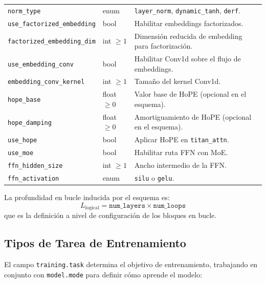 \documentclass[11pt,a4paper]{article}
\begin{document}
\begin{longtable}{p{5.1cm}p{2.4cm}p{7.0cm}}
\texttt{norm\_type} & enum & \texttt{layer\_norm}, \texttt{dynamic\_tanh}, \texttt{derf}. \\
\texttt{use\_factorized\_embedding} & bool & Habilitar embeddings factorizados. \\
\texttt{factorized\_embedding\_dim} & int $\ge 1$ & Dimensión reducida de embedding para factorización. \\
\texttt{use\_embedding\_conv} & bool & Habilitar Conv1d sobre el flujo de embeddings. \\
\texttt{embedding\_conv\_kernel} & int $\ge 1$ & Tamaño del kernel Conv1d. \\
\texttt{hope\_base} & float $\ge 0$ & Valor base de HoPE (opcional en el esquema). \\
\texttt{hope\_damping} & float $\ge 0$ & Amortiguamiento de HoPE (opcional en el esquema). \\
\texttt{use\_hope} & bool & Aplicar HoPE en \texttt{titan\_attn}. \\
\texttt{use\_moe} & bool & Habilitar ruta FFN con MoE. \\
\texttt{ffn\_hidden\_size} & int $\ge 1$ & Ancho intermedio de la FFN. \\
\texttt{ffn\_activation} & enum & \texttt{silu} o \texttt{gelu}. \\
\bottomrule
\end{longtable}
\normalsize

La profundidad en bucle inducida por el esquema es:
\[
L_{\text{logical}} = \texttt{num\_layers} \times \texttt{num\_loops}
\]
que es la definición a nivel de configuración de los bloques en bucle.

\subsection{Tipos de Tarea de Entrenamiento}

El campo \texttt{training.task} determina el objetivo de entrenamiento, trabajando en conjunto con \texttt{model.mode} para definir cómo aprende el modelo:
\end{document}
